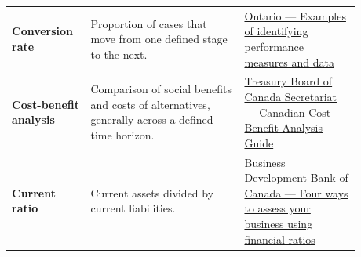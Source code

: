 \documentclass[11pt,letterpaper,oneside,openany]{book}
\begin{document}
\begin{center}
\begin{longtable}{>{\RaggedRight\arraybackslash}p{0.180\linewidth}>{\RaggedRight\arraybackslash}p{0.400\linewidth}>{\RaggedRight\arraybackslash}p{0.300\linewidth}}
\textbf{Conversion rate} & Proportion of cases that move from one defined stage to the next. & \href{https://www.ontario.ca/document/performance-measurement-agriculture-agri-food-and-economic-development-organizations/appendix-5-examples-identifying-performance-measures-and-data}{Ontario --- Examples of identifying performance measures and data} \\
\textbf{Cost-benefit analysis} & Comparison of social benefits and costs of alternatives, generally across a defined time horizon. & \href{https://www.tbs-sct.canada.ca/rtrap-parfa/analys/analys-eng.pdf}{Treasury Board of Canada Secretariat --- Canadian Cost-Benefit Analysis Guide} \\
\textbf{Current ratio} & Current assets divided by current liabilities. & \href{https://www.bdc.ca/en/articles-tools/money-finance/manage-finances/financial-ratios-4-ways-assess-business}{Business Development Bank of Canada --- Four ways to assess your business using financial ratios} \\
\end{longtable}
\end{center}
\end{document}
